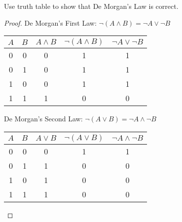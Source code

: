         \begin{exercise}
            Use truth table to show that De Morgan's Law is correct.
        \end{exercise}
        \begin{proof}
            De Morgan's First Law: \( \lnot (A \land B) = \lnot A \lor \lnot B \)
            
            \begin{tabular}{cc|c|c|c}
            \toprule
            \( A \) & \( B \) & \( A \land B \) & \( \lnot (A \land B) \) & \( \lnot A \lor \lnot B \) \\
            \midrule
            0 & 0 & 0 & 1 & 1 \\
            0 & 1 & 0 & 1 & 1 \\
            1 & 0 & 0 & 1 & 1 \\
            1 & 1 & 1 & 0 & 0 \\
            \bottomrule
            \end{tabular}

            \vspace{2em} 

            De Morgan's Second Law: \( \lnot (A \lor B) = \lnot A \land \lnot B \)

            \begin{tabular}{cc|c|c|c}
            \toprule
            \( A \) & \( B \) & \( A \lor B \) & \( \lnot (A \lor B) \) & \( \lnot A \land \lnot B \) \\
            \midrule
            0 & 0 & 0 & 1 & 1 \\
            0 & 1 & 1 & 0 & 0 \\
            1 & 0 & 1 & 0 & 0 \\
            1 & 1 & 1 & 0 & 0 \\
            \bottomrule
            \end{tabular}
        \end{proof}

